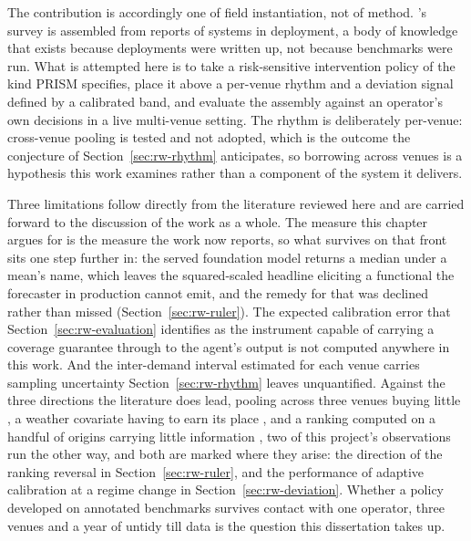 The contribution is accordingly one of field instantiation, not of method.
\citet{paleyes_challenges_2022}'s survey is assembled from reports of systems in
deployment, a body of knowledge that exists because deployments were written up,
not because benchmarks were run. What is attempted here is to take a
risk-sensitive intervention policy of the kind PRISM specifies, place it above a
per-venue rhythm and a deviation signal defined by a calibrated band, and
evaluate the assembly against an operator's own decisions in a live multi-venue
setting. The rhythm is deliberately per-venue: cross-venue pooling is tested and
not adopted, which is the outcome the conjecture of
Section~\ref{sec:rw-rhythm} anticipates, so borrowing across venues is a
hypothesis this work examines rather than a component of the system it delivers.

Three limitations follow directly from the literature reviewed here and are
carried forward to the discussion of the work as a whole. The measure this
chapter argues for is the measure the work now reports, so what survives on that
front sits one step further in: the served foundation model returns a median
under a mean's name, which leaves the squared-scaled headline eliciting a
functional the forecaster in production cannot emit, and the remedy for that was
declined rather than missed (Section~\ref{sec:rw-ruler}). The expected
calibration error that Section~\ref{sec:rw-evaluation} identifies as the
instrument capable of carrying a coverage guarantee through to the agent's
output is not computed anywhere in this work. And the inter-demand interval
estimated for each venue carries sampling uncertainty
Section~\ref{sec:rw-rhythm} leaves unquantified. Against the
three directions the literature does lead, pooling across three venues buying
little \citep{montero-manso_principles_2021}, a weather covariate having to earn
its place \citep{haben_short_2019,hertel_explainable_2026}, and a ranking
computed on a handful of origins carrying little information
\citep{hewamalage_look_2021,brigato_there_2025}, two of this project's
observations run the other way, and both are marked where they arise: the
direction of the ranking reversal in Section~\ref{sec:rw-ruler}, and the
performance of adaptive calibration at a regime change in
Section~\ref{sec:rw-deviation}. Whether a policy developed on annotated
benchmarks survives contact with one operator, three venues and a year of untidy
till data is the question this dissertation takes up.